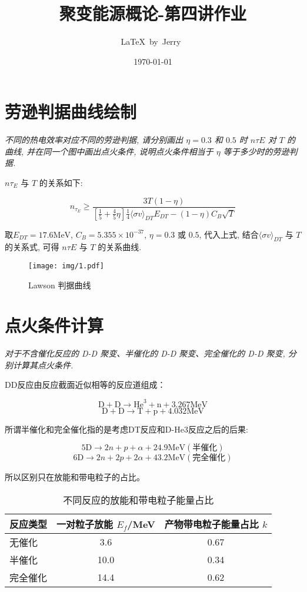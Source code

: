 \documentclass{article}
\title{聚变能源概论-第四讲作业}
\author{\LaTeX\ by\ Jerry\ }
\date{\today}
\begin{document}
\pagestyle{fancy}

\fancyhead[R]{\today}

\section{劳逊判据曲线绘制}
\emph{不同的热电效率对应不同的劳逊判据, 请分别画出 $\eta = 0.3$ 和 $0.5$ 时 $n\tau E$ 对 $T$ 的曲线, 并在同一个图中画出点火条件, 说明点火条件相当于 $\eta$ 等于多少时的劳逊判据. }

$n\tau_E$ 与 $T$ 的关系如下:

$$n_{\tau_E} \geq \frac{3T(1 - \eta)}{\left[\frac{1}{5} + \frac{4}{5}\eta\right]\frac{1}{4}\langle \sigma v \rangle_{DT} E_{DT} - (1 - \eta) C_B \sqrt{T}}$$

取$E_{DT} = 17.6 \text{MeV}$, $C_B = 5.355 \times 10^{-37}$, $\eta = 0.3$ 或 $0.5$, 代入上式, 结合$\langle \sigma v \rangle_{DT}$ 与 $T$ 的关系式, 可得 $n\tau E$ 与 $T$ 的关系曲线.

\begin{figure}[htpb]
    \centering
    \texttt{[image: img/1.pdf]}
    \caption{Lawson 判据曲线}
    \label{fig:1}
\end{figure}

\section{点火条件计算}
\emph{对于不含催化反应的 D-D 聚变、半催化的 D-D 聚变、完全催化的 D-D 聚变, 分别计算其点火条件. }

DD反应由反应截面近似相等的反应道组成：

$$\text{D} + \text{D} \rightarrow \text{He}^3 + \text{n} + 3.267 \text{MeV}$$
$$\text{D} + \text{D} \rightarrow \text{T} + \text{p} + 4.032 \text{MeV}$$

所谓半催化和完全催化指的是考虑DT反应和D-He3反应之后的后果:

$$ 5\text{D} \rightarrow 2n + p + \alpha + 24.9 \text{MeV} (\text{半催化})$$
$$ 6\text{D} \rightarrow 2n + 2p + 2\alpha + 43.2 \text{MeV} (\text{完全催化})$$

所以区别只在放能和带电粒子的占比。

\begin{table}[htpb]
    \centering
    \label{tab:reactions-and-energy}
    \begin{tabular}{|l|c|c|}
    \hline
    反应类型 & 一对粒子放能 $E_f$/MeV & 产物带电粒子能量占比 $k$ \\ \hline
    无催化 & 3.6 & 0.67 \\ \hline
    半催化 & 10.0 & 0.34 \\ \hline
    完全催化 & 14.4 & 0.62 \\ \hline
    \end{tabular}
    \caption{不同反应的放能和带电粒子能量占比}
\end{table}
\end{document}
